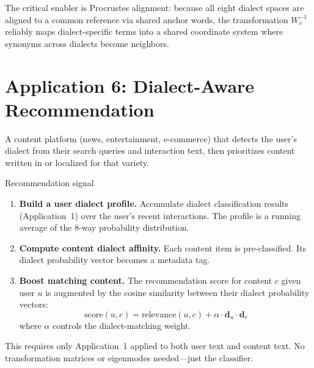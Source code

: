 \documentclass[11pt,a4paper]{article}
\begin{document}
The critical enabler is Procrustes alignment: because all eight
dialect spaces are aligned to a common reference via shared anchor
words, the transformation $W_v^{-1}$ reliably maps dialect-specific
terms into a shared coordinate system where synonyms across dialects
become neighbors.

\section{Application 6: Dialect-Aware Recommendation}
\label{sec:app-recommend}

\begin{appbox}
A content platform (news, entertainment, e-commerce) that detects the
user's dialect from their search queries and interaction text, then
prioritizes content written in or localized for that variety.
\end{appbox}

\begin{howbox}{Recommendation signal}
\begin{enumerate}[nosep]
  \item \textbf{Build a user dialect profile.} Accumulate dialect
    classification results (Application~1) over the user's recent
    interactions. The profile is a running average of the 8-way
    probability distribution.

  \item \textbf{Compute content dialect affinity.} Each content item
    is pre-classified. Its dialect probability vector becomes a
    metadata tag.

  \item \textbf{Boost matching content.} The recommendation score for
    content $c$ given user $u$ is augmented by the cosine similarity
    between their dialect probability vectors:
    \[
    \text{score}(u, c) = \text{relevance}(u, c) +
    \alpha \cdot \mathbf{d}_u \cdot \mathbf{d}_c
    \]
    where $\alpha$ controls the dialect-matching weight.
\end{enumerate}
\end{howbox}

This requires only Application~1 applied to both user text and content
text. No transformation matrices or eigenmodes needed---just the
classifier.

\end{document}
